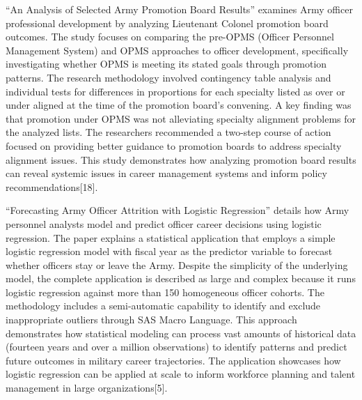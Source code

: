 \documentclass[./main.tex]{subfiles}
\begin{document}
``An Analysis of Selected Army Promotion Board Results'' examines Army
officer professional development by analyzing Lieutenant Colonel
promotion board outcomes. The study focuses on comparing the pre-OPMS
(Officer Personnel Management System) and OPMS approaches to officer
development, specifically investigating whether OPMS is meeting its
stated goals through promotion patterns. The research methodology
involved contingency table analysis and individual tests for differences
in proportions for each specialty listed as over or under aligned at the
time of the promotion board's convening. A key finding was that
promotion under OPMS was not alleviating specialty alignment problems
for the analyzed lists. The researchers recommended a two-step course of
action focused on providing better guidance to promotion boards to
address specialty alignment issues. This study demonstrates how
analyzing promotion board results can reveal systemic issues in career
management systems and inform policy recommendations{[}18{]}.

``Forecasting Army Officer Attrition with Logistic Regression'' details
how Army personnel analysts model and predict officer career decisions
using logistic regression. The paper explains a statistical application
that employs a simple logistic regression model with fiscal year as the
predictor variable to forecast whether officers stay or leave the Army.
Despite the simplicity of the underlying model, the complete application
is described as large and complex because it runs logistic regression
against more than 150 homogeneous officer cohorts. The methodology
includes a semi-automatic capability to identify and exclude
inappropriate outliers through SAS Macro Language. This approach
demonstrates how statistical modeling can process vast amounts of
historical data (fourteen years and over a million observations) to
identify patterns and predict future outcomes in military career
trajectories. The application showcases how logistic regression can be
applied at scale to inform workforce planning and talent management in
large organizations{[}5{]}.
\end{document}
